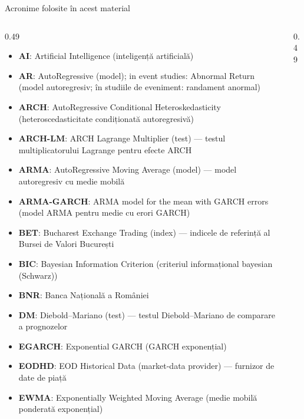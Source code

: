 {
\begin{frame}[noframenumbering]
    \titlepage
\end{frame}
}
\begin{frame}{Acronime folosite în acest material}
\begin{columns}[T]
\begin{column}{0.49\textwidth}
\begin{itemize}\setlength{\itemsep}{0pt}
    \item \textbf{AI}: Artificial Intelligence (inteligență artificială)
    \item \textbf{AR}: AutoRegressive (model); in event studies: Abnormal Return (model autoregresiv; în studiile de eveniment: randament anormal)
    \item \textbf{ARCH}: AutoRegressive Conditional Heteroskedasticity (heteroscedasticitate condiționată autoregresivă)
    \item \textbf{ARCH-LM}: ARCH Lagrange Multiplier (test) — testul multiplicatorului Lagrange pentru efecte ARCH
    \item \textbf{ARMA}: AutoRegressive Moving Average (model) — model autoregresiv cu medie mobilă
    \item \textbf{ARMA-GARCH}: ARMA model for the mean with GARCH errors (model ARMA pentru medie cu erori GARCH)
    \item \textbf{BET}: Bucharest Exchange Trading (index) — indicele de referință al Bursei de Valori București
    \item \textbf{BIC}: Bayesian Information Criterion (criteriul informațional bayesian (Schwarz))
    \item \textbf{BNR}: Banca Națională a României
    \item \textbf{DM}: Diebold–Mariano (test) — testul Diebold–Mariano de comparare a prognozelor
    \item \textbf{EGARCH}: Exponential GARCH (GARCH exponențial)
    \item \textbf{EODHD}: EOD Historical Data (market-data provider) — furnizor de date de piață
    \item \textbf{EWMA}: Exponentially Weighted Moving Average (medie mobilă ponderată exponențial)
\end{itemize}
\end{column}
\begin{column}{0.49\textwidth}

\end{column}
\end{columns}
\end{frame}
